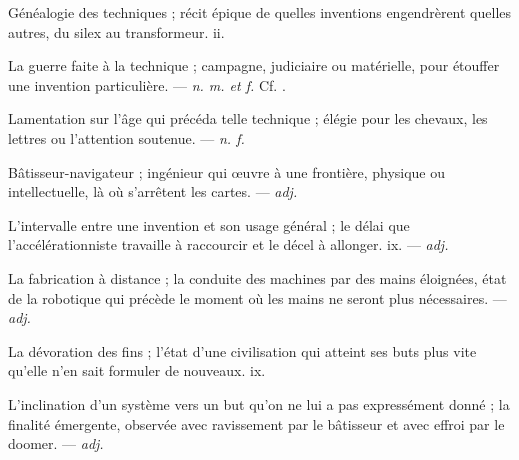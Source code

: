  Généalogie des techniques ; récit épique de quelles inventions engendrèrent quelles autres, du silex au transformeur.   ii.

 La guerre faite à la technique ; campagne, judiciaire ou matérielle, pour étouffer une invention particulière. ---  \textit{n. m. et f.} Cf. .

 Lamentation sur l'âge qui précéda telle technique ; élégie pour les chevaux, les lettres ou l'attention soutenue. ---  \textit{n. f.}

 Bâtisseur-navigateur ; ingénieur qui œuvre à une frontière, physique ou intellectuelle, là où s'arrêtent les cartes. ---  \textit{adj.}

 L'intervalle entre une invention et son usage général ; le délai que l'accélérationniste travaille à raccourcir et le décel à allonger.   ix. ---  \textit{adj.}

 La fabrication à distance ; la conduite des machines par des mains éloignées, état de la robotique qui précède le moment où les mains ne seront plus nécessaires. ---  \textit{adj.}

 La dévoration des fins ; l'état d'une civilisation qui atteint ses buts plus vite qu'elle n'en sait formuler de nouveaux.   ix.

 L'inclination d'un système vers un but qu'on ne lui a pas expressément donné ; la finalité émergente, observée avec ravissement par le bâtisseur et avec effroi par le doomer. ---  \textit{adj.}

